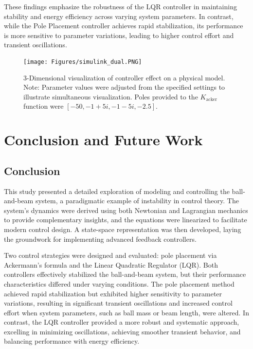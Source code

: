 \documentclass[conference]{IEEEtran}
\begin{document}
These findings emphasize the robustness of the LQR controller in maintaining stability and energy efficiency across varying system parameters. In contrast, while the Pole Placement controller achieves rapid stabilization, its performance is more sensitive to parameter variations, leading to higher control effort and transient oscillations.

\begin{figure}[H]
    \centering
    \texttt{[image: Figures/simulink\_dual.PNG]}
    \caption[short]{3-Dimensional visualization of controller effect on a physical model. 
    Note: Parameter values were adjusted from the specified settings to illustrate simultaneous visualization. Poles provided to the \(K_{\text{acker}}\) function were \([-50, -1+5i, -1-5i, -2.5]\).}
    \label{fig:3d_model}
\end{figure}
\section{Conclusion and Future Work}
\label{sec:conclusion}

\subsection{Conclusion}
This study presented a detailed exploration of modeling and controlling the ball-and-beam system, a paradigmatic example of instability in control theory. The system's dynamics were derived using both Newtonian and Lagrangian mechanics to provide complementary insights, and the equations were linearized to facilitate modern control design. A state-space representation was then developed, laying the groundwork for implementing advanced feedback controllers.

Two control strategies were designed and evaluated: pole placement via Ackermann’s formula and the Linear Quadratic Regulator (LQR). Both controllers effectively stabilized the ball-and-beam system, but their performance characteristics differed under varying conditions. The pole placement method achieved rapid stabilization but exhibited higher sensitivity to parameter variations, resulting in significant transient oscillations and increased control effort when system parameters, such as ball mass or beam length, were altered. In contrast, the LQR controller provided a more robust and systematic approach, excelling in minimizing oscillations, achieving smoother transient behavior, and balancing performance with energy efficiency.
\end{document}
